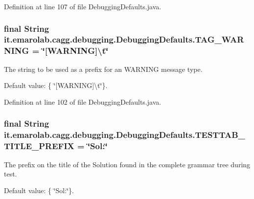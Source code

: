 Definition at line 107 of file Debugging\-Defaults.\-java.

\hypertarget{classit_1_1emarolab_1_1cagg_1_1debugging_1_1DebuggingDefaults_a404289c07e43a1d8bbbb5386a8350fea}{
\subsubsection[{T\-A\-G\-\_\-\-W\-A\-R\-N\-I\-N\-G}]{\setlength{\rightskip}{0pt plus 5cm}final String it.\-emarolab.\-cagg.\-debugging.\-Debugging\-Defaults.\-T\-A\-G\-\_\-\-W\-A\-R\-N\-I\-N\-G = \char`\"{}\mbox{[}W\-A\-R\-N\-I\-N\-G\mbox{]}\textbackslash{}t\char`\"{}\hspace{0.3cm}{\ttfamily [static]}}}\label{classit_1_1emarolab_1_1cagg_1_1debugging_1_1DebuggingDefaults_a404289c07e43a1d8bbbb5386a8350fea}
The string to be used as a prefix for an W\-A\-R\-N\-I\-N\-G message type.\par
 Default value\-: \{ \char`\"{}\mbox{[}\-W\-A\-R\-N\-I\-N\-G\mbox{]}\textbackslash{}t\char`\"{}\}. 

Definition at line 102 of file Debugging\-Defaults.\-java.

\hypertarget{classit_1_1emarolab_1_1cagg_1_1debugging_1_1DebuggingDefaults_aa3f1e6adf18ee1283bc869e23552fcae}{
\subsubsection[{T\-E\-S\-T\-T\-A\-B\-\_\-\-T\-I\-T\-L\-E\-\_\-\-P\-R\-E\-F\-I\-X}]{\setlength{\rightskip}{0pt plus 5cm}final String it.\-emarolab.\-cagg.\-debugging.\-Debugging\-Defaults.\-T\-E\-S\-T\-T\-A\-B\-\_\-\-T\-I\-T\-L\-E\-\_\-\-P\-R\-E\-F\-I\-X = \char`\"{}Sol\-:\char`\"{}\hspace{0.3cm}{\ttfamily [static]}}}\label{classit_1_1emarolab_1_1cagg_1_1debugging_1_1DebuggingDefaults_aa3f1e6adf18ee1283bc869e23552fcae}
The prefix on the title of the Solution found in the complete grammar tree during test.\par
 Default value\-: \{ \char`\"{}\-Sol\-:\char`\"{}\}. 

